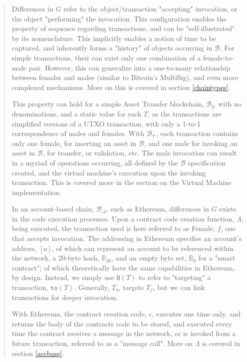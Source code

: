 \documentclass[12pt, titlepage, twocolumn]{report}
\begin{document}
\begin{quotation}
Differences in \(G\) refer to the object/transaction "accepting" invocation, or the object "performing" the invocation. This configuration enables the property of sequence regarding transactions, and can be "self-illustrated" by its nomenclature. This implicitly enables a notion of time to be captured, and inherently forms a "history" of objects occurring in \(\boldsymbol{\mathcal{B}}\). For simple transactions, their can exist only one combination of a female-to-male pair. However, this can generalize into a one-to-many relationship between females and males (similar to Bitcoin's MultiSig), and even more complexed mechanisms. More on this is covered in section \ref{chaintypes}. 

This property can hold for a simple Asset Transfer blockchain, \(\boldsymbol{\mathcal{B}}_{\mathcal{U}}\) with no denominations, and a static value for each \(T\), as the transactions are simplified versions of a UTXO transaction, with only a 1-to-1 correspondence of males and females. With \(\boldsymbol{\mathcal{B}}_{\mathcal{T}}\), each transaction contains only one female, for inserting an asset in \(\boldsymbol{\mathcal{B}}\), and one male for invoking an asset in \(\boldsymbol{\mathcal{B}}\), for transfer, or validation, etc. The male invocation can result in a myriad of operations occurring, all defined by the  \(\boldsymbol{\mathcal{B}}\) specification created, and the virtual machine's execution upon the invoking transaction. This is covered more in the section on the Virtual Machine implementation.

In an account-based chain, \(\boldsymbol{\mathcal{B}}_{\mathcal{A}}\), such as Ethereum, differences in \(G\) exists in the code execution processes. Upon a contract code creation function, \(\Lambda\), being executed, the transaction used is here referred to as Female, \(f\), one that accepts invocation. The addressing in Ethereum specifies an account's address, \([a]\), of which can represent an account to be referenced within the network, a 20-byte hash, \(\mathbb{B}_{20}\), and an empty byte set, \(\mathbb{B}_{0}\) for a "smart contract"; of which theoretically have the same capabilities in Ethereum, by design. Instead, we simply use \(\boldsymbol{\texttt{H}}(T)\) to refer to "targeting" a transaction, \(\texttt{to}(T)\). Generally, \(T_m\) targets \(T_f\), but we can link transactions for deeper invocation.



With Ethereum, the contract creation code, \(c\), executes one time only, and returns the body of the contracts code to be stored, and executed every time the contract receives a message in the network, or is invoked from a future transaction, referred to as a "message call". More on \(\Lambda\) is covered in section \ref{accbase}.


\end{quotation}
\end{document}

